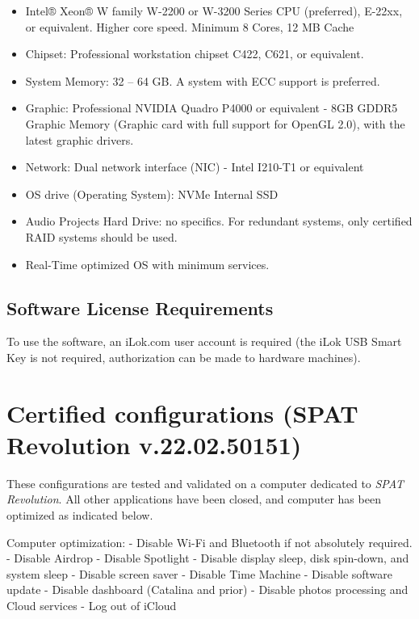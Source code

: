 \documentclass[
  letterpaper,
  DIV=11,
  numbers=noendperiod]{scrreport}
\providecommand{\tightlist}{%
  \setlength{\itemsep}{0pt}\setlength{\parskip}{0pt}}\usepackage{longtable,booktabs,array}
\begin{document}
\begin{itemize}
\tightlist
\item
  Intel® Xeon® W family W-2200 or W-3200 Series CPU (preferred), E-22xx,
  or equivalent. Higher core speed. Minimum 8 Cores, 12 MB Cache
\item
  Chipset: Professional workstation chipset C422, C621, or equivalent.
\item
  System Memory: 32 -- 64 GB. A system with ECC support is preferred.
\item
  Graphic: Professional NVIDIA Quadro P4000 or equivalent - 8GB GDDR5
  Graphic Memory (Graphic card with full support for OpenGL 2.0), with
  the latest graphic drivers.
\item
  Network: Dual network interface (NIC) - Intel I210-T1 or equivalent
\item
  OS drive (Operating System): NVMe Internal SSD
\item
  Audio Projects Hard Drive: no specifics. For redundant systems, only
  certified RAID systems should be used.
\item
  Real-Time optimized OS with minimum services.
\end{itemize}

\hypertarget{software-license-requirements}{%
\subsection{Software License
Requirements}\label{software-license-requirements}}

To use the software, an iLok.com user account is required (the iLok USB
Smart Key is not required, authorization can be made to hardware
machines).

\hypertarget{certified-configurations-spat-revolution-v.22.02.50151}{%
\section{Certified configurations (SPAT Revolution
v.22.02.50151)}\label{certified-configurations-spat-revolution-v.22.02.50151}}

These configurations are tested and validated on a computer dedicated to
\emph{SPAT Revolution}. All other applications have been closed, and
computer has been optimized as indicated below.

Computer optimization: - Disable Wi-Fi and Bluetooth if not absolutely
required. - Disable Airdrop - Disable Spotlight - Disable display sleep,
disk spin-down, and system sleep - Disable screen saver - Disable Time
Machine - Disable software update - Disable dashboard (Catalina and
prior) - Disable photos processing and Cloud services - Log out of
iCloud
\end{document}
